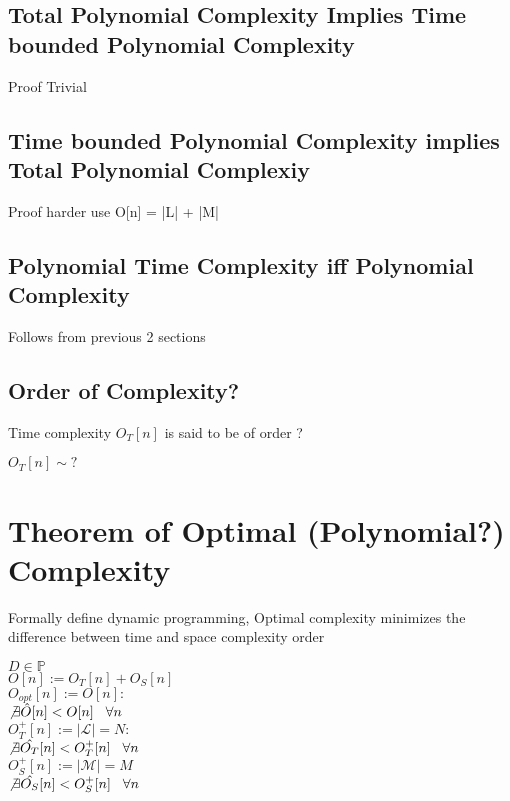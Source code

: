 \documentclass[11pt]{article}
\begin{document}
\subsection{Total Polynomial Complexity Implies Time bounded Polynomial Complexity}
Proof Trivial




\subsection{Time bounded Polynomial Complexity implies Total Polynomial Complexiy}
Proof harder use O[n] = |L| + |M|



\subsection{Polynomial Time Complexity iff Polynomial Complexity}
Follows from previous 2 sections



\subsection{Order of Complexity?}
Time complexity $O_T[n]$ is said to be of order ?
\begin{center}
$
 O_T[n] \sim ?
$
\end{center}






\section{Theorem of Optimal (Polynomial?) Complexity}
Formally define dynamic programming, Optimal complexity minimizes the difference between time and space complexity order
\begin{center}
\vspace{2mm}
$
D \in \mathbb{P}
$
\\ \vspace{2mm}
$
O[n] := O_T[n] + O_S[n]
$
\\ \vspace{2mm}
$
O_{opt}[n] := O[n] :
$
\\ \vspace{2mm}
$
\not \exists \hat{O} \lbrack n \rbrack < O[n] \hspace{3mm} \forall n
$
\\ \vspace{6mm}
$
O_T^+[n] := |\mathcal{L}| = N :
$
\\ \vspace{2mm}
$
\not \exists \hat{O_T} \lbrack n \rbrack < O^+_{T}[n] \hspace{3mm} \forall n
$
\\ \vspace{2mm}
$
O_S^+[n] := |\mathcal{M}| = M
$
\\ \vspace{2mm}
$
\not \exists \hat{O_S} \lbrack n \rbrack < O^+_{S}[n] \hspace{3mm} \forall n
$
\end{center}
\end{document}
